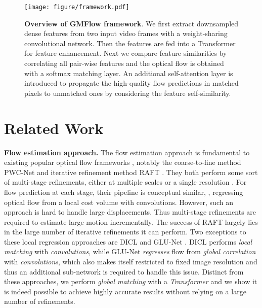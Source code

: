 \documentclass[10pt,twocolumn,letterpaper]{article}
\begin{document}
\begin{figure*}
    \centering
    \texttt{[image: figure/framework.pdf]}
    \vspace{-14pt}
    \caption{\textbf{Overview of GMFlow framework}. We first extract  downsampled dense features from two input video frames with a weight-sharing convolutional network. Then the features are fed into a Transformer for feature enhancement. Next we compare feature similarities by correlating all pair-wise features and the optical flow is obtained with a softmax matching layer. An additional self-attention layer is introduced to propagate the high-quality flow predictions in matched pixels to unmatched ones by considering the feature self-similarity.}
    \label{fig:overview}
    \vspace{-14pt}
\end{figure*}

\section{Related Work}



{\bf Flow estimation approach.} The flow estimation approach is fundamental to existing popular optical flow frameworks \cite{ilg2017flownet,sun2018pwc,hur2019iterative,teed2020raft,xu2021high,Jiang_2021_ICCV,Zhang_2021_ICCV}, notably the coarse-to-fine method PWC-Net \cite{sun2018pwc} and iterative refinement method RAFT \cite{teed2020raft}. They both perform some sort of multi-stage refinements, either at multiple scales \cite{sun2018pwc} or a single resolution \cite{teed2020raft}. For flow prediction at each stage, their pipeline is conceptual similar, \ie, regressing optical flow from a local cost volume with convolutions. However, such an approach is hard to handle large displacements. Thus multi-stage refinements are required to estimate large motion incrementally. The success of RAFT largely lies in the large number of iterative refinements it can perform. Two exceptions to these local regression approaches are DICL \cite{wang2020displacement} and GLU-Net \cite{truong2020glu}. DICL performs \emph{local matching} with \emph{convolutions}, while GLU-Net \emph{regresses} flow from \emph{global correlation} with \emph{convolutions}, which also makes itself restricted to fixed image resolution and thus an additional sub-network is required to handle this issue. Distinct from these approaches, we perform \emph{global matching} with a \emph{Transformer} and we show it is indeed possible to achieve highly accurate results without relying on a large number of refinements.
\end{document}
